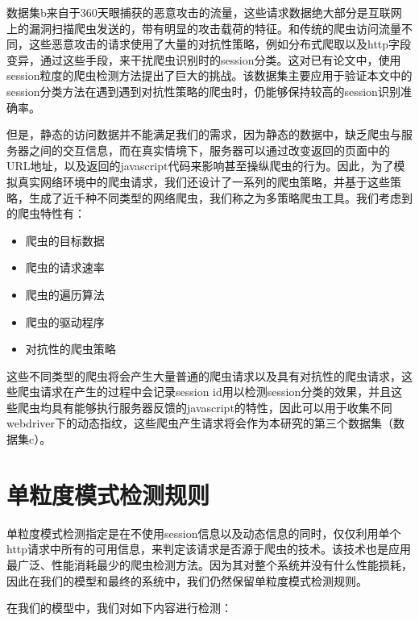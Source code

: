 \documentclass[doctor,privacy,twoside]{buaa_mac}
\begin{document}
数据集b来自于360天眼捕获的恶意攻击的流量，这些请求数据绝大部分是互联网上的漏洞扫描爬虫发送的，带有明显的攻击载荷的特征。和传统的爬虫访问流量不同，这些恶意攻击的请求使用了大量的对抗性策略，例如分布式爬取以及http字段变异，通过这些手段，来干扰爬虫识别时的session分类。这对已有论文中，使用session粒度的爬虫检测方法提出了巨大的挑战。该数据集主要应用于验证本文中的session分类方法在遇到遇到对抗性策略的爬虫时，仍能够保持较高的session识别准确率。

但是，静态的访问数据并不能满足我们的需求，因为静态的数据中，缺乏爬虫与服务器之间的交互信息，而在真实情境下，服务器可以通过改变返回的页面中的URL地址，以及返回的javascript代码来影响甚至操纵爬虫的行为。因此，为了模拟真实网络环境中的爬虫请求，我们还设计了一系列的爬虫策略，并基于这些策略，生成了近千种不同类型的网络爬虫，我们称之为多策略爬虫工具。我们考虑到的爬虫特性有：
\begin{itemize}
\item 爬虫的目标数据
\item 爬虫的请求速率
\item 爬虫的遍历算法
\item 爬虫的驱动程序
\item 对抗性的爬虫策略
\end{itemize}

这些不同类型的爬虫将会产生大量普通的爬虫请求以及具有对抗性的爬虫请求，这些爬虫请求在产生的过程中会记录session id用以检测session分类的效果，并且这些爬虫均具有能够执行服务器反馈的javascript的特性，因此可以用于收集不同webdriver下的动态指纹，这些爬虫产生请求将会作为本研究的第三个数据集（数据集c）。


\section{单粒度模式检测规则}
单粒度模式检测指定是在不使用session信息以及动态信息的同时，仅仅利用单个http请求中所有的可用信息，来判定该请求是否源于爬虫的技术。该技术也是应用最广泛、性能消耗最少的爬虫检测方法。因为其对整个系统并没有什么性能损耗，因此在我们的模型和最终的系统中，我们仍然保留单粒度模式检测规则。

在我们的模型中，我们对如下内容进行检测：
\end{document}
